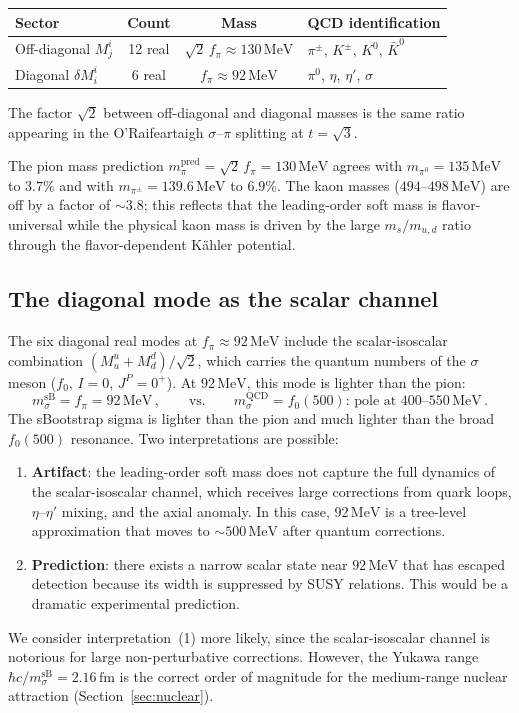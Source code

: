 \documentclass[12pt,a4paper]{article}
\newcommand{\MeV}{\,\text{MeV}}
\newcommand{\fpi}{f_\pi}
\begin{document}
\begin{center}
\begin{tabular}{lccl}
\toprule
Sector & Count & Mass & QCD identification \\
\midrule
Off-diagonal $M^i_j$ & 12 real & $\sqrt{2}\,\fpi \approx 130\MeV$
  & $\pi^\pm$, $K^\pm$, $K^0$, $\bar K^0$ \\
Diagonal $\delta M^i_i$ & 6 real & $\fpi \approx 92\MeV$
  & $\pi^0$, $\eta$, $\eta'$, $\sigma$ \\
\bottomrule
\end{tabular}
\end{center}

The factor $\sqrt{2}$ between off-diagonal and diagonal masses
is the same ratio appearing in the O'Raifeartaigh $\sigma$--$\pi$
splitting at $t = \sqrt{3}$.

The pion mass prediction $m_\pi^{\text{pred}} = \sqrt{2}\,\fpi
= 130\MeV$ agrees with $m_{\pi^0} = 135\MeV$ to $3.7\%$
and with $m_{\pi^\pm} = 139.6\MeV$ to $6.9\%$.
The kaon masses ($494$--$498\MeV$) are off by a factor of $\sim 3.8$;
this reflects that the leading-order soft mass is flavor-universal
while the physical kaon mass is driven by the large $m_s/m_{u,d}$
ratio through the flavor-dependent Kähler potential.

\subsection{The diagonal mode as the scalar channel}

The six diagonal real modes at $\fpi \approx 92\MeV$ include the
scalar-isoscalar combination $(M^u_u + M^d_d)/\sqrt{2}$, which carries
the quantum numbers of the $\sigma$ meson ($f_0$, $I=0$, $J^P=0^+$).
At $92\MeV$, this mode is lighter than the pion:
\begin{equation}
  m_\sigma^{\text{sB}} = \fpi = 92\MeV\,,
  \qquad \text{vs.}\qquad
  m_\sigma^{\text{QCD}} = f_0(500)\text{: pole at }400\text{--}550\MeV\,.
\end{equation}
The sBootstrap sigma is lighter than the pion and much lighter than
the broad $f_0(500)$ resonance. Two interpretations are possible:
\begin{enumerate}
\item \textbf{Artifact}: the leading-order soft mass does not capture
the full dynamics of the scalar-isoscalar channel, which receives large
corrections from quark loops, $\eta$--$\eta'$ mixing, and the axial
anomaly.  In this case, $92\MeV$ is a tree-level
approximation that moves to $\sim 500\MeV$ after quantum corrections.
\item \textbf{Prediction}: there exists a narrow scalar state near
$92\MeV$ that has escaped detection because its width is suppressed
by SUSY relations.  This would be a dramatic experimental prediction.
\end{enumerate}
We consider interpretation~(1) more likely, since the scalar-isoscalar
channel is notorious for large non-perturbative corrections.  However,
the Yukawa range $\hbar c / m_\sigma^{\text{sB}} = 2.16\,\text{fm}$
is the correct order of magnitude for the medium-range nuclear
attraction (Section~\ref{sec:nuclear}).
\end{document}
